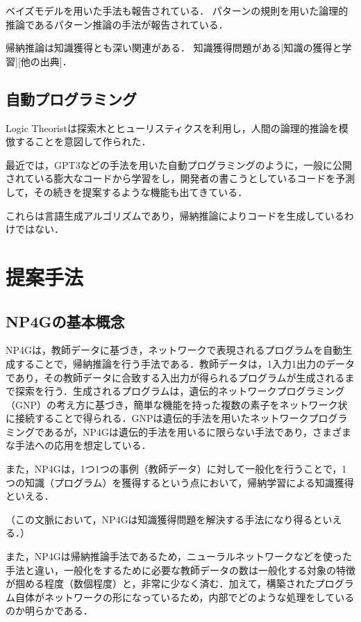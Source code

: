 \documentclass[exploratorypaper]{jsaiart} %
\begin{document}
ベイズモデルを用いた手法も報告されている\cite{TENENBAUM2006}．
パターンの規則を用いた論理的推論であるパターン推論の手法が報告されている\cite{tsukimoto:00}\cite{sudo:07}．


帰納推論は知識獲得とも深い関連がある．
知識獲得問題がある\cite{KnowledgeAI}[知識の獲得と学習][他の出典]．
\subsection{自動プログラミング}
Logic Theorist\cite{LogicTheorist}は探索木とヒューリスティクスを利用し，人間の論理的推論を模倣することを意図して作られた．

最近では，GPT3\cite{gpt3}などの手法を用いた自動プログラミングのように，一般に公開されている膨大なコードから学習をし，開発者の書こうとしているコードを予測して，その続きを提案するような機能も出てきている\cite{copilot}．

これらは言語生成アルゴリズムであり，帰納推論によりコードを生成しているわけではない．

\section{提案手法}
\subsection{NP4Gの基本概念}
NP4Gは，教師データに基づき，ネットワークで表現されるプログラムを自動生成することで，帰納推論を行う手法である．教師データは，1入力1出力のデータであり，その教師データに合致する入出力が得られるプログラムが生成されるまで探索を行う．生成されるプログラムは，遺伝的ネットワークプログラミング（GNP）の考え方に基づき，簡単な機能を持った複数の素子をネットワーク状に接続することで得られる．GNPは遺伝的手法を用いたネットワークプログラミングであるが，NP4Gは遺伝的手法を用いるに限らない手法であり，さまざまな手法への応用を想定している．

また，NP4Gは，1つ1つの事例（教師データ）に対して一般化を行うことで，1つの知識（プログラム）を獲得するという点において，帰納学習による知識獲得といえる．

（この文脈において，NP4Gは知識獲得問題を解決する手法になり得るといえる．）

また，NP4Gは帰納推論手法であるため，ニューラルネットワークなどを使った手法と違い，一般化をするために必要な教師データの数は一般化する対象の特徴が掴める程度（数個程度）と，非常に少なく済む．加えて，構築されたプログラム自体がネットワークの形になっているため，内部でどのような処理をしているのか明らかである．
\end{document}
